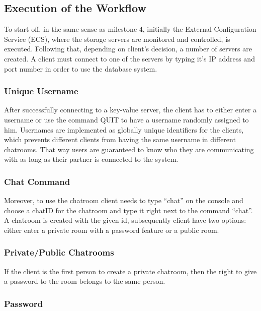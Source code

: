 \subsection{Execution of the Workflow}
\label{sec:groupchat_executionoftheworkflow}

To start off, in the same sense as milestone 4, initially the External Configuration Service (ECS), where the storage servers are monitored and controlled, is executed. Following that, depending on client's decision, a number of servers are created. A client must connect to one of the servers by typing it's IP address and port number in order to use the database system.

\subsubsection{Unique Username}
\label{sec:groupchat_executionoftheworkflow_uniqueusername}
After successfully connecting to a key-value server, the client has to either enter a username or use the command QUIT to have a username randomly assigned to him. Usernames are implemented as globally unique identifiers for the clients, which prevents different clients from having the same username in different chatrooms. That way users are guaranteed to know who they are communicating with as long as their partner is connected to the system. 
 
\subsubsection{Chat Command}
\label{sec:groupchat_executionoftheworkflow_chatcommand}

Moreover, to use the chatroom client needs to type “chat” on the console and choose a chatID for the chatroom and type it right next to the command “chat”. A chatroom is created with the given id, subsequently client have two options: either enter a private room with a password feature or a public room. 
\subsubsection{Private/Public Chatrooms}
\label{sec:groupchat_executionoftheworkflow_chatrooms}

If the client is the first person to create a private chatroom, then the right to give a password to the room belongs to the same person.
\subsubsection{Password}
\label{sec:groupchat_executionoftheworkflow_chatrooms_password}

